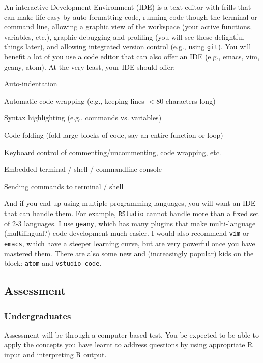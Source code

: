 An interactive Development Environment (IDE) is a text editor with 
frills that can make life easy by auto-formatting code, running code 
though the terminal or command line, allowing a graphic view of the 
workspace (your active functions, variables, etc.), graphic debugging 
and profiling (you will see these delightful things later), and 
allowing integrated version control (e.g., using {\tt git}). You will 
benefit a lot of you use a code editor that can also offer an IDE 
(e.g., emacs, vim, geany, atom). At the very least, your IDE should offer:
\begin{compactitem}
	\item Auto-indentation
	\item Automatic code wrapping (e.g., keeping lines $<$80 characters 
	long)
	\item Syntax highlighting (e.g., commands vs. variables)
	\item Code folding (fold large blocks of code, say an entire 
	function or loop)
	\item Keyboard control of commenting/uncommenting, code wrapping, etc.
	\item Embedded terminal / shell / commandline console
	\item Sending commands to terminal / shell
\end{compactitem}

And if you end up using multiple programming languages, you will want 
an IDE that can handle them. For example, {\tt RStudio} cannot handle more 
than a fixed set of 2-3 languages. I use {\tt geany}, which has many 
plugins that make multi-language (multilingual?) code development much 
easier. I would also recommend {\tt vim} or {\tt emacs}, which have a 
steeper learning curve, but are very powerful once you have mastered 
them. There are also some new and (increasingly popular) kids on the 
block: {\tt atom} and {\tt vstudio code}.

\subsection{Assessment}

\subsubsection{Undergraduates}

Assessment will be through a computer-based test. You be expected to be 
able to apply the concepts you have learnt to address questions by 
using appropriate R input and interpreting R output. 


